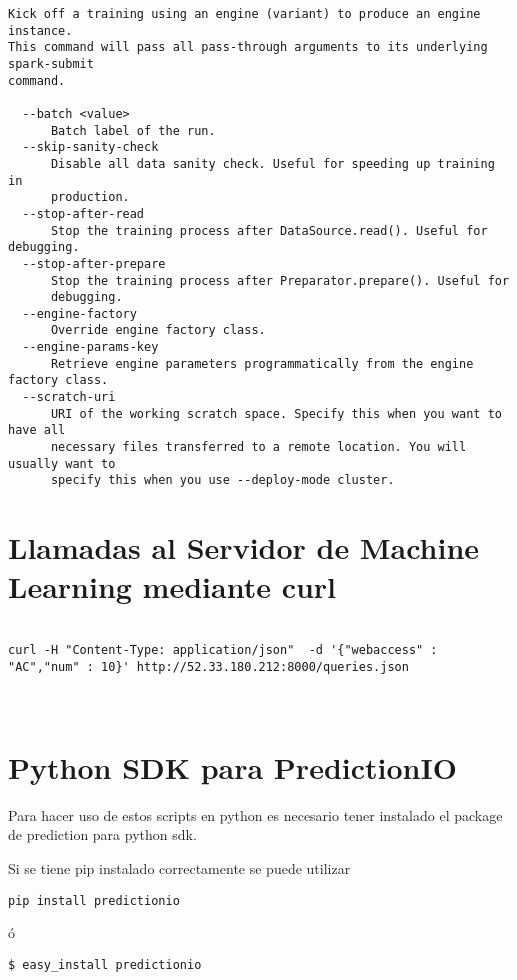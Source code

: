 \begin{lstlisting}[frame=single,basicstyle=\ttfamily\tiny,]
Kick off a training using an engine (variant) to produce an engine instance.
This command will pass all pass-through arguments to its underlying spark-submit
command.

  --batch <value>
      Batch label of the run.
  --skip-sanity-check
      Disable all data sanity check. Useful for speeding up training in
      production.
  --stop-after-read
      Stop the training process after DataSource.read(). Useful for debugging.
  --stop-after-prepare
      Stop the training process after Preparator.prepare(). Useful for
      debugging.
  --engine-factory
      Override engine factory class.
  --engine-params-key
      Retrieve engine parameters programmatically from the engine factory class.
  --scratch-uri
      URI of the working scratch space. Specify this when you want to have all
      necessary files transferred to a remote location. You will usually want to
      specify this when you use --deploy-mode cluster.

\end{lstlisting}

\vspace{1cm}


\section {Llamadas al Servidor de Machine Learning mediante curl }


\begin{lstlisting}

curl -H "Content-Type: application/json"  -d '{"webaccess" : "AC","num" : 10}' http://52.33.180.212:8000/queries.json



\end{lstlisting}



\section{Python SDK para PredictionIO}

Para hacer uso de estos scripts en python es necesario tener instalado el package de prediction para python sdk.

Si se tiene pip instalado correctamente se puede utilizar

\begin{verbatim}
pip install predictionio
\end{verbatim}
ó
\begin{verbatim}
$ easy_install predictionio
\end{verbatim}


